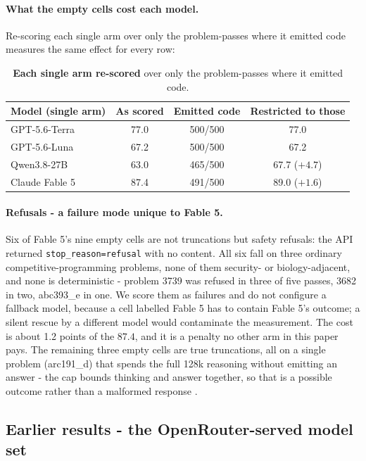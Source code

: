 \documentclass[11pt]{article}
\begin{document}
\paragraph{What the empty cells cost each model.}
Re-scoring each single arm over only the problem-passes where it emitted code measures the
same effect for every row:

\begin{table}[htbp]
\centering
\caption{\textbf{Each single arm re-scored} over only the
problem-passes where it emitted code.}
\small
\begin{tabular}{@{}lccc@{}}
\toprule
\textbf{Model (single arm)} & \textbf{As scored} & \textbf{Emitted code} &
\textbf{Restricted to those} \\
\midrule
GPT-5.6-Terra  & 77.0 & 500/500 & 77.0 \\
GPT-5.6-Luna   & 67.2 & 500/500 & 67.2 \\
Qwen3.8-27B    & 63.0 & 465/500 & 67.7 ($+4.7$) \\
Claude Fable 5 & 87.4 & 491/500 & 89.0 ($+1.6$) \\
\bottomrule
\end{tabular}
\end{table}

\paragraph{Refusals - a failure mode unique to Fable 5.}
Six of Fable 5's nine empty cells are not truncations but safety refusals: the
API returned \texttt{stop\_reason=refusal} with no content. All six fall on three
ordinary competitive-programming problems, none of them security- or biology-adjacent, and
none is deterministic - problem 3739 was refused in three of five passes, 3682 in two,
abc393\_e in one. We score them as failures and do not configure a fallback model,
because a cell labelled Fable 5 has to contain Fable 5's outcome; a silent rescue by a
different model would contaminate the measurement. The cost is about 1.2 points of the
$87.4$, and it is a penalty no other arm in this paper pays. The remaining three empty
cells are true truncations, all on a single problem (arc191\_d) that spends the full 128k
reasoning without emitting an answer - the cap bounds thinking and answer together, so
that is a possible outcome rather than a malformed
response \cite{anthropic2026effort}.

\FloatBarrier

\subsection{Earlier results - the OpenRouter-served model set}
\end{document}
